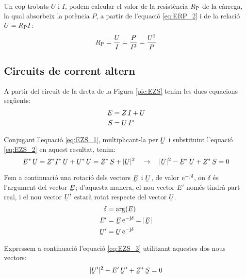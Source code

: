 Un cop trobats $U$ i $I$, podem calcular el valor de la resist\`{e}ncia
$R_\mathrm{P}$ de la c\`{a}rrega, la qual absorbeix la pot\`{e}ncia $P$, a
partir de l'equaci\'{o} \eqref{eq:ERP_2} i de la relaci\'{o} $U =R_\mathrm{P}
I$:
\begin{equation}
   R_\mathrm{P} = \frac{U}{I} = \frac{P}{I^2} = \frac{U^2}{P}
\end{equation}

\subsection{Circuits de corrent altern}

A partir del circuit de la dreta de la Figura \vref{pic:EZS} tenim les dues equacions seg\"{u}ents:
\begin{align}
   \cmplx{E} &= \cmplx{Z} \, \cmplx{I} + \cmplx{U} \label{eq:EZS_1} \\
   \cmplx{S} &= \cmplx{U} \, \cmplx{I}^*           \label{eq:EZS_2}
\end{align}

Conjugant l'equaci\'{o} \eqref{eq:EZS_1}, multiplicant-la per $\cmplx{U}$ i substituint l'equaci\'{o} \eqref{eq:EZS_2} en aquest resultat, tenim:
\begin{equation}
   \cmplx{E}^* \, \cmplx{U} = \cmplx{Z}^* \cmplx{I}^* \, \cmplx{U} + \cmplx{U}^* \, \cmplx{U} =
   \cmplx{Z}^* \, \cmplx{S} + |\cmplx{U}|^2 \quad \rightarrow \quad
   |\cmplx{U}|^2 - \cmplx{E}^* \, \cmplx{U} + \cmplx{Z}^* \, \cmplx{S} = 0
   \label{eq:EZS_3}
\end{equation}

Fem a continuaci\'{o} una rotaci\'{o} dels vectors $\cmplx{E}$ i $\cmplx{U}$, de valor
$\mathrm{e}^{-\mathrm{j}\delta}$, on $\delta$ \'{e}s l'argument del vector $\cmplx{E}$; d'aquesta manera, el
nou vector $E'$ nom\'{e}s tindr\`{a} part real, i el nou vector $\cmplx{U}'$ estar\`{a} rotat respecte
del vector $\cmplx{U}$.
\begin{align}
   \delta &= \arg(\cmplx{E}) \label{eq:EZS_9} \\
   E' &= \cmplx{E} \, \eu^{-\ju\delta} = |\cmplx{E}|  \label{eq:EZS_4} \\
   \cmplx{U}' &= \cmplx{U} \, \eu^{-\ju\delta}   \label{eq:EZS_5}
\end{align}

Expressem a continuaci\'{o} l'equaci\'{o} \eqref{eq:EZS_3} utilitzant aquestes dos nous vectors:
\begin{equation}
   |\cmplx{U}'|^2 - E' \, \cmplx{U}' + \cmplx{Z}^* \, \cmplx{S} = 0 \label{eq:EZS_6}
\end{equation}

